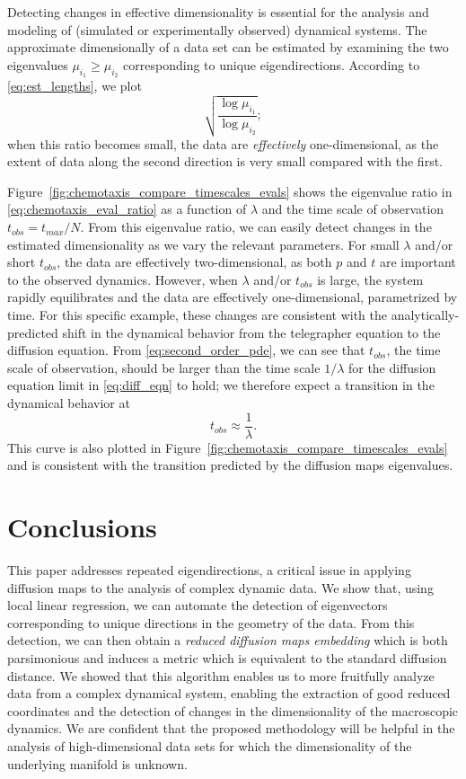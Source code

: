 \documentclass[3p]{elsarticle}
\begin{document}
Detecting changes in effective dimensionality is essential for the analysis and modeling of (simulated or experimentally observed) dynamical systems.
%
The approximate dimensionally of a data set can be estimated by examining the 
two eigenvalues $\mu_{i_1} \ge \mu_{i_2}$ corresponding to unique eigendirections.
%
According to \eqref{eq:est_lengths}, we plot
\begin{equation}\label{eq:chemotaxis_eval_ratio}
 \sqrt{\frac{\log \mu_{i_1}}{\log \mu_{i_2}}} ;
\end{equation}
when this ratio becomes small, the data are {\em effectively} one-dimensional, as the extent of data along the second direction is very 
small compared with the first.

Figure~\ref{fig:chemotaxis_compare_timescales_evals} shows the eigenvalue ratio in \eqref{eq:chemotaxis_eval_ratio} as 
a function of $\lambda$ and the time scale of observation $t_{obs} = t_{max} / N$.
%
From this eigenvalue ratio, we can easily detect changes in the estimated dimensionality as we vary the relevant parameters.
%
For small $\lambda$ and/or short $t_{obs}$, the data are effectively two-dimensional, as both $p$ and $t$ are important to the observed dynamics.
%
However, when $\lambda$ and/or $t_{obs}$ is large, the system rapidly equilibrates and the data are effectively one-dimensional, parametrized by time.
%
For this specific example, these changes are consistent with the analytically-predicted  shift in the dynamical behavior from the telegrapher equation to the diffusion equation.
%
From \eqref{eq:second_order_pde}, we can see that $t_{obs}$, the time scale of observation, should be larger than the time scale $1/\lambda$ for the diffusion equation limit in \eqref{eq:diff_eqn} to hold; we therefore expect a transition in the dynamical behavior at
\begin{equation}
t_{obs} \approx \frac{1}{\lambda}.
\end{equation}
%
This curve is also plotted in Figure~\ref{fig:chemotaxis_compare_timescales_evals} and is consistent with the transition predicted by the diffusion maps eigenvalues.

\section{Conclusions}

This paper addresses repeated eigendirections, a critical issue in applying diffusion maps to the analysis of complex dynamic data.
%
We show that, using local linear regression, we can automate the detection of eigenvectors corresponding to unique directions in the
geometry of the data.
%
From this detection, we can then obtain a {\em reduced diffusion maps embedding} which is both parsimonious and 
induces a metric which is equivalent to the standard diffusion distance.
%
We showed that this algorithm enables us to more fruitfully analyze data from a complex dynamical system, 
enabling the extraction of good reduced coordinates and the detection of changes in the dimensionality of the macroscopic dynamics.
%
We are confident that the proposed methodology will be helpful in the analysis of high-dimensional data sets for which 
the dimensionality of the underlying manifold is unknown.
\end{document}
